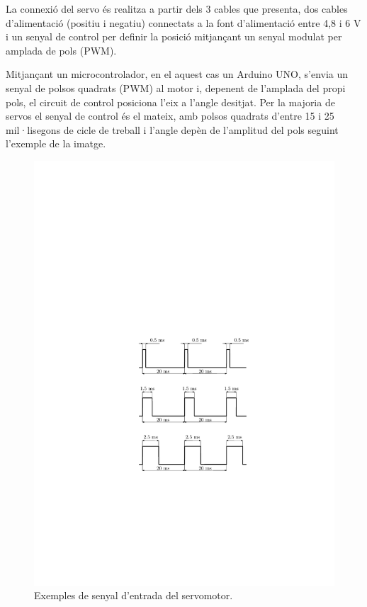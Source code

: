 La connexió del servo és realitza a partir dels 3 cables que presenta, dos cables d'alimentació (positiu i negatiu) connectats a la font d’alimentació entre 4,8 i 6 V i un senyal de control per definir la posició mitjançant un senyal modulat per amplada de pols (PWM).

Mitjançant un microcontrolador, en el aquest cas un Arduino UNO, s’envia un senyal de polsos quadrats (PWM) al motor i, depenent de l’amplada del propi pols, el circuit de control posiciona l’eix a l’angle desitjat. Per la majoria de servos el senyal de control és el mateix, amb polsos quadrats d’entre 15 i 25 mil·lisegons de cicle de treball i l’angle depèn de l’amplitud del pols seguint l’exemple de la imatge. 
\begin{figure}[H]
	\centering
	\includegraphics{senyal_servo}
	\caption{Exemples de senyal d'entrada del servomotor.}
	\label{fig:entradaservo}
\end{figure}

